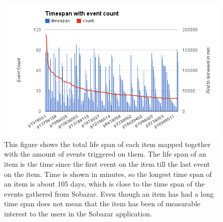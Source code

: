     \begin{figure}[H]
        \includegraphics[width=5in]{image/item-timespan-event-count.png}
        \centering
        \caption[Life time of items mapped with event count]{This figure shows the total life span of each item mapped together with the amount of events triggered on them.
        The life span of an item is the time since the first event on the item till the last event on the item.
        Time is shown in minutes, so the longest time span of an item is about 105 days, which is close to the time span of the events gathered from Sobazar.
        Even though an item has had a long time span does not mean that the item has been of measurable interest to the users in the Sobazar application.}
        \label{figure:itemTimeSpanEventCount}
    \end{figure}

